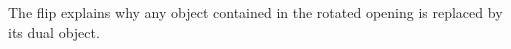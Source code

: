 \documentclass[12pt, a4paper]{amsart}
\theoremstyle{definition}
\theoremstyle{remark}
\numberwithin{equation}{section}
\begin{document}
The flip explains why any object contained in the rotated opening is replaced by its dual object.

%
%
%
%
%
%
\end{document}
